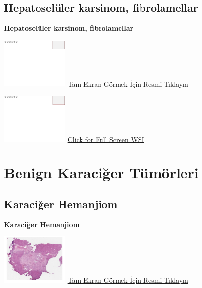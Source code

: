 \documentclass[
  letterpaper,
  DIV=11,
  numbers=noendperiod]{scrreprt}
\begin{document}
\hypertarget{sec-hepatoseluler-karsinom-fibrolamellar}{%
\section{Hepatoselüler karsinom,
fibrolamellar}\label{sec-hepatoseluler-karsinom-fibrolamellar}}

\textbf{Hepatoselüler karsinom, fibrolamellar}

\href{https://images.patolojiatlasi.com/template/HE.html}{\includegraphics[width=0.25\textwidth,height=\textheight]{./screenshots/template_screenshot.png}}
\href{https://images.patolojiatlasi.com/fibrolamellar-hepatocellular-carcinoma/HE1.html}{Tam
Ekran Görmek İçin Resmi Tıklayın}

\href{https://images.patolojiatlasi.com/template/HE.html}{\includegraphics[width=0.25\textwidth,height=\textheight]{./screenshots/template_screenshot.png}}
\href{https://images.patolojiatlasi.com/fibrolamellar-hepatocellular-carcinoma/HE4.html}{Click
for Full Screen WSI}

\hypertarget{sec-benign-karaciger-tumorleri}{%
\chapter{Benign Karaciğer
Tümörleri}\label{sec-benign-karaciger-tumorleri}}

\hypertarget{sec-karaciger-hemanjiom}{%
\section{Karaciğer Hemanjiom}\label{sec-karaciger-hemanjiom}}

\textbf{Karaciğer Hemanjiom}

\href{https://images.patolojiatlasi.com/liver-hemangioma/HE.html}{\includegraphics[width=0.25\textwidth,height=\textheight]{./screenshots/liver-hemangioma_screenshot.png}}
\href{https://images.patolojiatlasi.com/liver-hemangioma/HE.html}{Tam
Ekran Görmek İçin Resmi Tıklayın}
\end{document}
